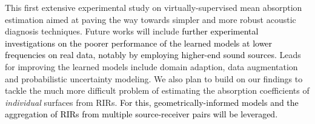 \documentclass[reprint]{JASA}
\begin{document}
This first extensive experimental study on virtually-supervised mean absorption estimation aimed at paving the way towards simpler and more robust acoustic diagnosis techniques. Future works will include \textcolor{black}{further experimental investigations on the poorer performance of the learned models at lower frequencies on real data, notably by employing higher-end sound sources}. Leads for improving the learned models include domain adaption, data augmentation and probabilistic uncertainty modeling. We also plan to build on our findings to tackle the much more difficult problem of estimating the absorption coefficients of \textit{individual} surfaces from RIRs. \textcolor{black}{For this, geometrically-informed models and the aggregation of RIRs from multiple source-receiver pairs will be leveraged.}






%

%
\end{document}
